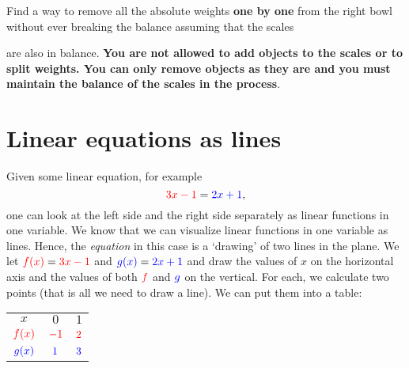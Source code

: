 \documentclass[a4paper,11pt]{article}
\newcommand{\tr}{\textcolor{red}}
\newcommand{\tb}{\textcolor{blue}}
\begin{document}
\begin{enumerate}[topsep=0pt,label=\arabic*.]
\begin{center}
 \end{center}
 Find a way to remove all the absolute weights \textbf{one by one} from the
 right bowl without ever breaking the balance assuming that the scales
 \begin{center}
 \end{center}
 are also in balance. \textbf{You are not allowed to add objects to the scales
 or to split weights. You can only remove objects as they are and you must
 maintain the balance of the scales in the process}.
\end{enumerate}

\section*{Linear equations as lines}

Given some linear equation, for example
\[
 \tr{3x - 1} = \tb{2x + 1},
\]
one can look at the left side and the right side separately as linear functions
in one variable. We know that we can visualize linear functions in one variable
as lines. Hence, the \emph{equation} in this case is a `drawing' of two lines in
the plane. We let $\tr{f(x)} = \tr{3x - 1}$ and $\tb{g(x)} = \tb{2x + 1}$ and
draw the values of $x$ on the horizontal axis and the values of both $\tr{f}$
and $\tb{g}$ on the vertical. For each, we calculate two points (that is all we
need to draw a line). We can put them into a table:

\begin{center}
 \begin{tabular}{c|cc}
  $x$ & $0$ & $1$\\
  \cmidrule{1-3}
  $\tr{f(x)}$ & $\tr{-1}$ & $\tr{2}$\\
  \cmidrule{1-3}
  $\tb{g(x)}$ & $\tb{1}$ & $\tb{3}$
 \end{tabular}
\end{center}
\end{document}
